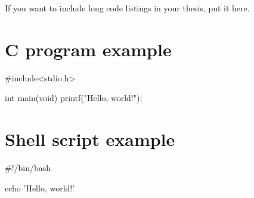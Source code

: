 \documentclass{swfuthesise}
\begin{document}
If you want to include long code listings in your thesis, put it here.

\section{C program example}
\label{sec:c-example}

\lipsum[50]

\begin{ccode}
#include<stdio.h>

int main(void)
{
  printf("Hello, world!\n");
}
\end{ccode}

\section{Shell script example}
\label{sec:shell-script-example}

\lipsum[51]

\begin{shellcode}
  #!/bin/bash

  echo 'Hello, world!'
\end{shellcode}
\end{document}
